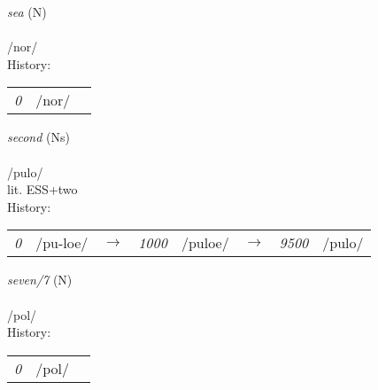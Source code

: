 \vspace{15pt}
\begin{nopagebreak}
 \textit{sea} (N)\\
\\
\noindent /n{\textprimstress}or/\\


\noindent History:

\vspace{-0pt}
\hspace{40pt}
\begin{tabular}{ccc}
\textit{0} & /nor/& \\
\end{tabular}

\vspace{20pt}\hline

\end{nopagebreak}
\filbreak



\vspace{15pt}
\begin{nopagebreak}
 \textit{second} (Ns)\\
\\
\noindent /p{\textprimstress}ulo/\\
\noindent lit. ESS+two\\


\noindent History:

\vspace{-0pt}
\hspace{40pt}
\begin{tabular}{ccc}
\textit{0} & /pu-loe/&$\rightarrow$ & \textit{1000} & /puloe/&$\rightarrow$ & \textit{9500} & /pulo/& \\
\end{tabular}

\vspace{20pt}\hline

\end{nopagebreak}
\filbreak



\vspace{15pt}
\begin{nopagebreak}
 \textit{seven/7} (N)\\
\\
\noindent /p{\textprimstress}ol/\\


\noindent History:

\vspace{-0pt}
\hspace{40pt}
\begin{tabular}{ccc}
\textit{0} & /pol/& \\
\end{tabular}

\vspace{20pt}\hline

\end{nopagebreak}
\filbreak



